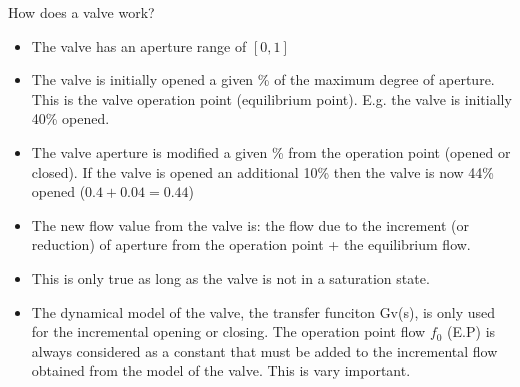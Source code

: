 How does a valve work?
\begin{itemize}
    \item The valve has an aperture range of $[0, 1]$
    \item The valve is initially opened a given \% of the maximum degree of aperture. This is the valve operation point (equilibrium point). E.g. the valve is initially 40\% opened.
    \item The valve aperture is modified a given \% from the operation point (opened or closed). If the valve is opened an additional 10\% then the valve is now 44\% opened ($0.4 + 0.04 = 0.44$)
    \item The new flow value from the valve is: the flow due to the increment (or reduction) of aperture from the operation point + the equilibrium flow.
    \item This is only true as long as the valve is not in a saturation state.
    \item The dynamical model of the valve, the transfer funciton Gv(s), is only used for the incremental opening or closing. The operation point flow $f_0$ (E.P) is always considered as a constant that must be added to the incremental flow obtained from the model of the valve. This is vary important.
\end{itemize}